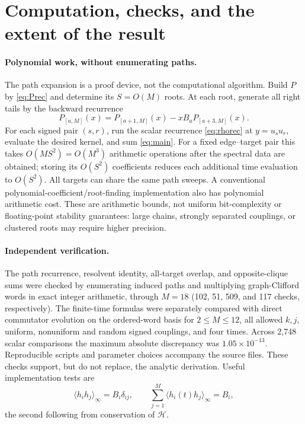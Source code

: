 \documentclass[11pt,a4paper]{article}
\newcommand{\av}[1]{\langle #1\rangle_\infty}
\newcommand{\HH}{\mathcal H}
\newcommand{\PP}[1]{P_{[#1]}}
\begin{document}
\section{Computation, checks, and the extent of the result}
\paragraph{Polynomial work, without enumerating paths.}
The path expansion is a proof device, not the computational algorithm. Build $P$ by \eqref{eq:Prec} and determine its $S=O(M)$ roots. At each root, generate all right tails by the backward recurrence
\begin{equation}
 \PP{a,M}(x)=\PP{a+1,M}(x)-xB_a\PP{a+3,M}(x).
\end{equation}
For each signed pair $(s,r)$, run the scalar recurrence \eqref{eq:rhorec} at $y=u_su_r$, evaluate the desired kernel, and sum \eqref{eq:main}. For a fixed edge--target pair this takes $O(MS^2)=O(M^3)$ arithmetic operations after the spectral data are obtained; storing its $O(S^2)$ coefficients reduces each additional time evaluation to $O(S^2)$. All targets can share the same path sweeps. A conventional polynomial-coefficient/root-finding implementation also has polynomial arithmetic cost. These are arithmetic bounds, not uniform bit-complexity or floating-point stability guarantees: large chains, strongly separated couplings, or clustered roots may require higher precision.

\paragraph{Independent verification.}
The path recurrence, resolvent identity, all-target overlap, and opposite-clique sums were checked by enumerating induced paths and multiplying graph-Clifford words in exact integer arithmetic, through $M=18$ (102, 51, 509, and 117 checks, respectively). The finite-time formulas were separately compared with direct commutator evolution on the ordered-word basis for $2\le M\le12$, all allowed $k,j$, uniform, nonuniform and random signed couplings, and four times. Across 2,748 scalar comparisons the maximum absolute discrepancy was $1.05\times10^{-13}$. Reproducible scripts and parameter choices accompany the source files. These checks support, but do not replace, the analytic derivation. Useful implementation tests are
\begin{equation}
 \av{h_i h_j}=B_i\delta_{ij},\qquad
 \sum_{j=1}^{M}\av{h_i(t)h_j}=B_i,
\end{equation}
the second following from conservation of $\HH$.
\end{document}
